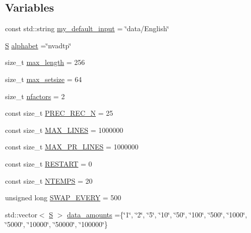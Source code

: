 \subsection*{Variables}
\begin{DoxyCompactItemize}
\item 
const std\+::string \hyperlink{_formal_language_theory-_complex_2_main_8cpp_aff5a98e66ee22e2c2547530190ecfd3d}{my\+\_\+default\+\_\+input} = \char`\"{}data/English\char`\"{}
\item 
\hyperlink{_formal_language_theory-_complex_2_main_8cpp_a51c40915539205f0b5add30b0d68a4cb}{S} \hyperlink{_formal_language_theory-_complex_2_main_8cpp_ad762aabf5f551e4c7632fb389b3e2209}{alphabet} =\char`\"{}nvadtp\char`\"{}
\item 
size\+\_\+t \hyperlink{_formal_language_theory-_complex_2_main_8cpp_aa94da4036d516add23ae35c670300c32}{max\+\_\+length} = 256
\item 
size\+\_\+t \hyperlink{_formal_language_theory-_complex_2_main_8cpp_aafa4cc7b8a249ecb81ad63ca7a2a6150}{max\+\_\+setsize} = 64
\item 
size\+\_\+t \hyperlink{_formal_language_theory-_complex_2_main_8cpp_abbce8dbfea6f30b87265ddd94cb933f7}{nfactors} = 2
\item 
const size\+\_\+t \hyperlink{_formal_language_theory-_complex_2_main_8cpp_a948185958f7efc05b85ac4084d82e3b9}{P\+R\+E\+C\+\_\+\+R\+E\+C\+\_\+N} = 25
\item 
const size\+\_\+t \hyperlink{_formal_language_theory-_complex_2_main_8cpp_a40344102d720622016c257aa59a33b6d}{M\+A\+X\+\_\+\+L\+I\+N\+ES} = 1000000
\item 
const size\+\_\+t \hyperlink{_formal_language_theory-_complex_2_main_8cpp_a5923038d8dfed7c8eaac4111396b490f}{M\+A\+X\+\_\+\+P\+R\+\_\+\+L\+I\+N\+ES} = 1000000
\item 
const size\+\_\+t \hyperlink{_formal_language_theory-_complex_2_main_8cpp_ada34ee41f51e229e0d5e00b99aed5991}{R\+E\+S\+T\+A\+RT} = 0
\item 
const size\+\_\+t \hyperlink{_formal_language_theory-_complex_2_main_8cpp_a6aa2c568bc3a4f1e1f586980b31b6699}{N\+T\+E\+M\+PS} = 20
\item 
unsigned long \hyperlink{_formal_language_theory-_complex_2_main_8cpp_a30d8f792c547d6073063d862794d030a}{S\+W\+A\+P\+\_\+\+E\+V\+E\+RY} = 500
\item 
std\+::vector$<$ \hyperlink{_formal_language_theory-_complex_2_main_8cpp_a51c40915539205f0b5add30b0d68a4cb}{S} $>$ \hyperlink{_formal_language_theory-_complex_2_main_8cpp_acb338cf650cba49a5be5dabfffad0dbd}{data\+\_\+amounts} =\{\char`\"{}1\char`\"{}, \char`\"{}2\char`\"{}, \char`\"{}5\char`\"{}, \char`\"{}10\char`\"{}, \char`\"{}50\char`\"{}, \char`\"{}100\char`\"{}, \char`\"{}500\char`\"{}, \char`\"{}1000\char`\"{}, \char`\"{}5000\char`\"{}, \char`\"{}10000\char`\"{}, \char`\"{}50000\char`\"{}, \char`\"{}100000\char`\"{}\}

\end{DoxyCompactItemize}
